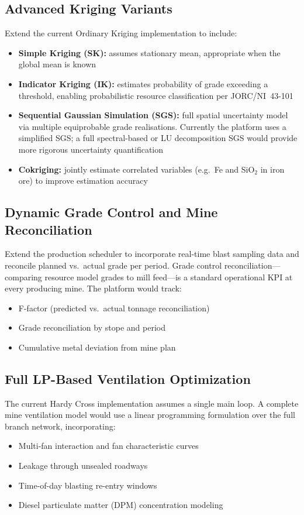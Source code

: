 \documentclass[12pt,a4paper]{article}
\begin{document}
\subsection{Advanced Kriging Variants}
Extend the current Ordinary Kriging implementation to include:
\begin{itemize}[itemsep=0.1em]
    \item \textbf{Simple Kriging (SK):} assumes stationary mean, appropriate when the global mean is known
    \item \textbf{Indicator Kriging (IK):} estimates probability of grade exceeding a threshold, enabling probabilistic resource classification per JORC/NI~43-101
    \item \textbf{Sequential Gaussian Simulation (SGS):} full spatial uncertainty model via multiple equiprobable grade realisations. Currently the platform uses a simplified SGS; a full spectral-based or LU decomposition SGS would provide more rigorous uncertainty quantification
    \item \textbf{Cokriging:} jointly estimate correlated variables (e.g.\ Fe and SiO$_2$ in iron ore) to improve estimation accuracy
\end{itemize}

\subsection{Dynamic Grade Control and Mine Reconciliation}
Extend the production scheduler to incorporate real-time blast sampling data and reconcile planned vs.\ actual grade per period. Grade control reconciliation---comparing resource model grades to mill feed---is a standard operational KPI at every producing mine. The platform would track:
\begin{itemize}[itemsep=0.1em]
    \item F-factor (predicted vs.\ actual tonnage reconciliation)
    \item Grade reconciliation by stope and period
    \item Cumulative metal deviation from mine plan
\end{itemize}

\subsection{Full LP-Based Ventilation Optimization}
The current Hardy Cross implementation assumes a single main loop. A complete mine ventilation model would use a linear programming formulation over the full branch network, incorporating:
\begin{itemize}[itemsep=0.1em]
    \item Multi-fan interaction and fan characteristic curves
    \item Leakage through unsealed roadways
    \item Time-of-day blasting re-entry windows
    \item Diesel particulate matter (DPM) concentration modeling
\end{itemize}
\end{document}
